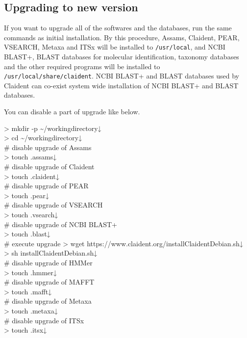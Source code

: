 \documentclass[titlepage,10pt,a4paper,english]{jsbook}
\newenvironment{cmd}{\begin{oframed}\raggedright\ttfamily\footnotesize\setlength{\baselineskip}{1.4em}}{\end{oframed}\vspace{-1em}}
\begin{document}
\subsection{Upgrading to new version}

If you want to upgrade all of the softwares and the databases, run the same commands as initial installation. By this procedure, Assams, Claident, PEAR, VSEARCH, Metaxa and ITSx will be installed to \texttt{/usr/local}, and NCBI BLAST+, BLAST databases for molecular identification, taxonomy databases and the other required programs will be installed to \texttt{/usr/local/share/claident}. NCBI BLAST+ and BLAST databases used by Claident can co-exist system wide installation of NCBI BLAST+ and BLAST databases.

You can disable a part of upgrade like below.
\begin{cmd}
{\textgreater} mkdir -p {\textasciitilde}/workingdirectory↓\\
{\textgreater} cd {\textasciitilde}/workingdirectory↓\\
\# disable upgrade of Assams\\
{\textgreater} touch .assams↓\\
\# disable upgrade of Claident\\
{\textgreater} touch .claident↓\\
\# disable upgrade of PEAR\\
{\textgreater} touch .pear↓\\
\# disable upgrade of VSEARCH\\
{\textgreater} touch .vsearch↓\\
\# disable upgrade of NCBI BLAST+\\
{\textgreater} touch .blast↓\\
\# execute upgrade
{\textgreater} wget https://www.claident.org/installClaident{\textunderscore}Debian.sh↓\\
{\textgreater} sh installClaident{\textunderscore}Debian.sh↓\\
\# disable upgrade of HMMer\\
{\textgreater} touch .hmmer↓\\
\# disable upgrade of MAFFT\\
{\textgreater} touch .mafft↓\\
\# disable upgrade of Metaxa\\
{\textgreater} touch .metaxa↓\\
\# disable upgrade of ITSx\\
{\textgreater} touch .itsx↓\\

\end{cmd}
\end{document}
